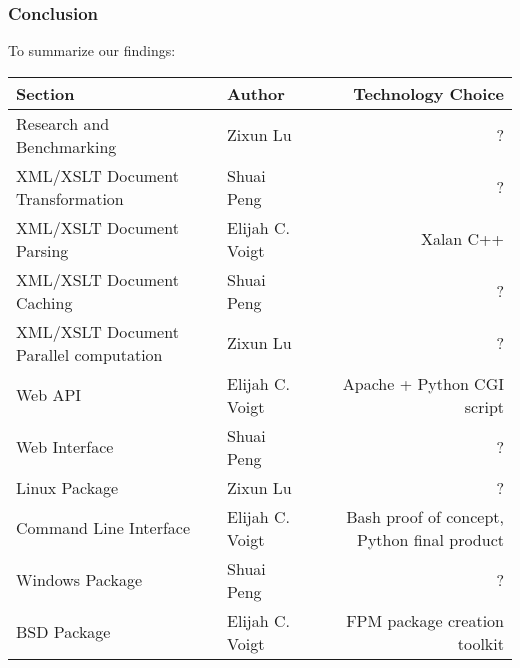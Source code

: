 \subsubsection{Conclusion}

To summarize our findings:

\begin{center}
    \begin{tabular}{ | l | p{5cm} | r | }
    \hline
    Section & Author & Technology Choice\\ \hline
    Research and Benchmarking & Zixun Lu & ? \\ \hline
    XML/XSLT Document Transformation & Shuai Peng & ? \\ \hline
    XML/XSLT Document Parsing & Elijah C. Voigt & Xalan C++ \\ \hline
    XML/XSLT Document Caching & Shuai Peng & ? \\ \hline
    XML/XSLT Document Parallel computation & Zixun Lu & ? \\ \hline
    Web API & Elijah C. Voigt & Apache + Python CGI script \\ \hline
    Web Interface & Shuai Peng & ? \\ \hline
    Linux Package & Zixun Lu & ? \\ \hline
    Command Line Interface& Elijah C. Voigt & Bash proof of concept, Python final product \\ \hline
    Windows Package & Shuai Peng & ? \\ \hline
    BSD Package & Elijah C. Voigt & FPM package creation toolkit \\ \hline
    \end{tabular}
\end{center}

\clearpage
